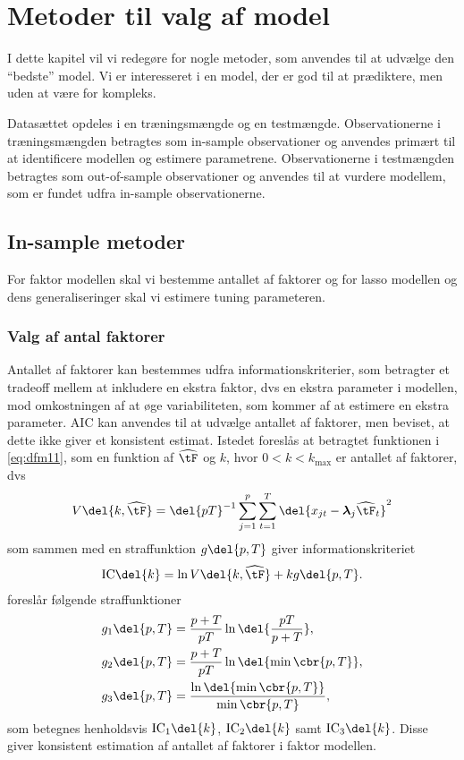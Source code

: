 \chapter{Metoder til valg af model} \label{ch:metoder}
I dette kapitel vil vi redegøre for nogle metoder, som anvendes til at udvælge den ``bedste'' model. 
Vi er interesseret i en model, der er god til at prædiktere, men uden at være for kompleks.

Datasættet opdeles i en træningsmængde og en testmængde. 
Observationerne i træningsmængden betragtes som in-sample observationer og anvendes primært til at identificere modellen og estimere parametrene. 
Observationerne i testmængden betragtes som out-of-sample observationer og anvendes til at vurdere modellem, som er fundet udfra in-sample observationerne. 
 
\section{In-sample metoder}
For faktor modellen skal vi bestemme antallet af faktorer og for lasso modellen og dens generaliseringer skal vi estimere tuning parameteren.

\subsection{Valg af antal faktorer} \label{sec:faktorer}
Antallet af faktorer kan bestemmes udfra informationskriterier, som betragter et tradeoff mellem at inkludere en ekstra faktor, dvs en ekstra parameter i modellen, mod omkostningen af at øge variabiliteten, som kommer af at estimere en ekstra parameter.
AIC kan anvendes til at udvælge antallet af faktorer, men \citep{Bai_Ng} beviset, at dette ikke giver et konsistent estimat.
Istedet foreslås at betragtet funktionen i \eqref{eq:dfm11}, som en funktion af \(\widehat{\tF}\) og \(k\), hvor \(0<k<k_\text{max}\) er antallet af faktorer, dvs
\begin{align*}
V \del{k, \widehat{\tF}} = \del{p T}^{-1} \sum_{j=1}^p \sum_{t=1}^{T} \del{x_{jt} -\boldsymbol{\lambda}_j \widehat{\tF}_t}^2
\end{align*}
som sammen med en straffunktion \(g \del{p,T}\) giver informationskriteriet
\begin{align*}
\text{IC} \del{k} = \ln V \del{k, \widehat{\tF}} + k g \del{p,T}.
\end{align*}
\citep{Bai_Ng} foreslår følgende straffunktioner
\begin{align}
g_1 \del{p,T} &= \frac{p + T}{p T} \ln \del{\frac{p T}{p + T}}, \label{eq:ic1} \\
g_2 \del{p,T} &= \frac{p + T}{p T} \ln \del{ \min \cbr{p, T}}, \label{eq:ic2} \\
g_3 \del{p,T} &= \frac{\ln \del{\min \cbr{p, T}}}{\min \cbr{p, T}},\label{eq:ic3}
\end{align}
som betegnes henholdsvis \(\text{IC}_1 \del{k}\), \(\text{IC}_2 \del{k}\) samt \(\text{IC}_3 \del{k}\). Disse giver konsistent estimation af antallet af faktorer i faktor modellen.

